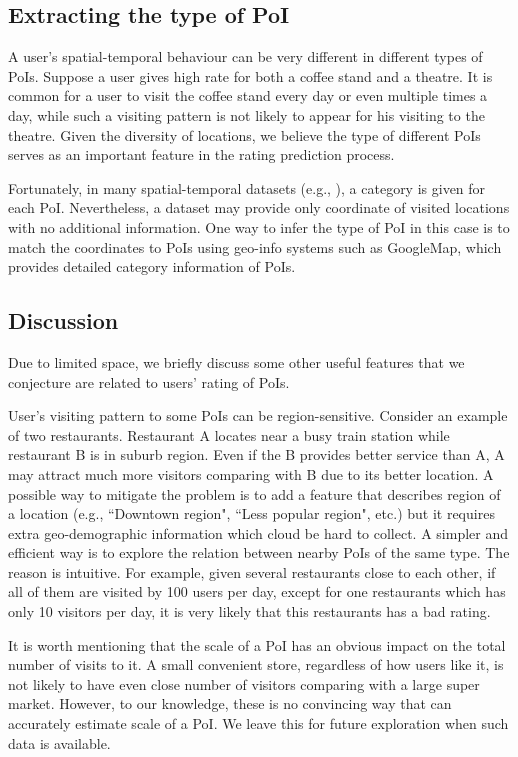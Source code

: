 \subsection{Extracting the type of PoI}

A user's spatial-temporal behaviour can be very different in different types of PoIs. Suppose a user gives high rate for both a coffee stand and a theatre. It is common for a user to visit the coffee stand every day or even multiple times a day, while such a visiting pattern is not likely to appear for his visiting to the theatre. Given the diversity of locations, we believe the type of different PoIs serves as an important feature in the rating prediction process.

Fortunately, in many spatial-temporal datasets (e.g., \cite{yang2014modeling}), a category is given for each PoI. Nevertheless, a dataset may provide only coordinate of visited locations with no additional information. One way to infer the type of PoI in this case is to match the coordinates to PoIs using geo-info systems such as GoogleMap, which provides detailed category information of PoIs.

\subsection{Discussion}

Due to limited space, we briefly discuss some other useful features that we conjecture are related to users' rating of PoIs.

 User's visiting pattern to some PoIs can be region-sensitive. Consider an example of two restaurants. Restaurant A locates near a busy train station while restaurant B is in suburb region. Even if the B provides better service than A, A may attract much more visitors comparing with B due to its better location. A possible way to mitigate the problem is to add a feature that describes region of a location (e.g., ``Downtown region", ``Less popular region", etc.) but it requires extra geo-demographic information which cloud be hard to collect. A simpler and efficient way is to explore the relation between nearby PoIs of the same type. The reason is intuitive. For example, given several restaurants close to each other, if all of them are visited by 100 users per day, except for one restaurants which has only 10 visitors per day, it is very likely that this restaurants has a bad rating.

 It is worth mentioning that the scale of a PoI has an obvious impact on the total number of visits to it. A small convenient store, regardless of how users like it, is not likely to have even close number of visitors comparing with a large super market. However, to our knowledge, these is no convincing way that can accurately estimate scale of a PoI. We leave this for future exploration when such data is available.

